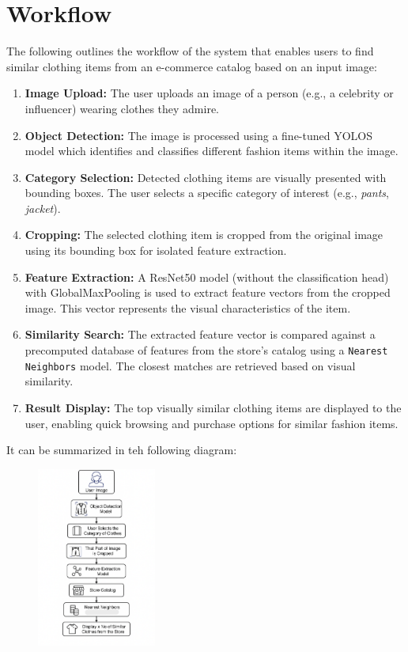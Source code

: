 \section*{Workflow}

The following outlines the workflow of the system that enables users to find similar clothing items from an e-commerce catalog based on an input image:

\begin{enumerate}
    \item \textbf{Image Upload:} The user uploads an image of a person (e.g., a celebrity or influencer) wearing clothes they admire.

    \item \textbf{Object Detection:} The image is processed using a fine-tuned YOLOS model which identifies and classifies different fashion items within the image.

    \item \textbf{Category Selection:} Detected clothing items are visually presented with bounding boxes. The user selects a specific category of interest (e.g., \textit{pants}, \textit{jacket}).

    \item \textbf{Cropping:} The selected clothing item is cropped from the original image using its bounding box for isolated feature extraction.

    \item \textbf{Feature Extraction:} A ResNet50 model (without the classification head) with GlobalMaxPooling is used to extract feature vectors from the cropped image. This vector represents the visual characteristics of the item.

    \item \textbf{Similarity Search:} The extracted feature vector is compared against a precomputed database of features from the store's catalog using a \texttt{Nearest Neighbors} model. The closest matches are retrieved based on visual similarity.

    \item \textbf{Result Display:} The top visually similar clothing items are displayed to the user, enabling quick browsing and purchase options for similar fashion items.
\end{enumerate}

It can be summarized in teh following diagram:

\begin{figure}[H]
  \centering
    \includegraphics[width=0.35\textwidth]{images/workflow.png}
  \end{figure}

